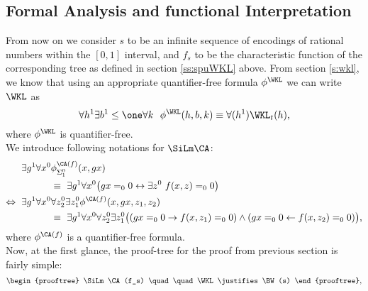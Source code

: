 %
\subsection{Formal Analysis and functional Interpretation} \label{ss:fafi}
%
%
%
%
From now on we consider $s$ to be an infinite sequence of encodings of rational 
numbers within the $[0,1]$ interval, and $f_s$ to be the characteristic function of
the corresponding tree as defined in section \ref{ss:spuWKL} above.
From section \ref{s:wkl}, we know that using an 
appropriate quantifier-free formula $\phi^{\WKL}$
we can write $\WKL$ as
\[
\forall h^1\exists b^1\leq\one\forall k\ \ \phi^{\WKL}(h,b,k)\equiv\forall(h^1)\WKL_t(h)
\text{,}
\]
where $\phi^{\WKL}$ is quantifier-free.\\
We introduce following notations for $\SiLm\CA$:
\begin{align*}
\exists g^1\forall x^0 &\phi^{\CA(f)}_{\Sigma^0_1}(x,gx)\\
&\equiv\ \exists g^1\forall x^0 \big(gx=_00 \leftrightarrow \exists z^0\ f(x,z)=_00\big)\\
\Leftrightarrow\ 
\exists g^1\forall x^0 &\forall z^0_2\exists z^0_1 \phi^{\CA(f)}(x,gx,z_1,z_2)\\
&\equiv\
\exists g^1\forall x^0\forall z^0_2\exists z^0_1
   \big((gx=_00 \rightarrow f(x,z_1)=_00)\wedge(gx=_00 \leftarrow f(x,z_2)=_00) \big)
\text{,}
\end{align*}
where $\phi^{\CA(f)}$ is a quantifier-free formula. \\
Now, at the first glance, the proof-tree for the proof from previous
 section is fairly simple:
\[
\begin{prooftree}
\SiLm\CA(f_s)
 \quad \quad
\WKL
\justifies
\BW(s)
\end{prooftree}
\text{,}
\]
